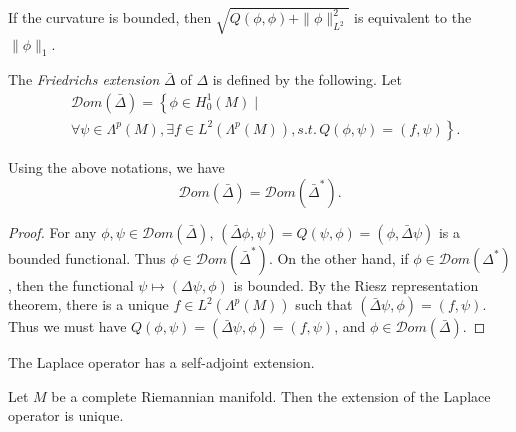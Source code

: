 \begin{proposition}\label{prop1} If the curvature is bounded, then
$\sqrt{Q(\phi,\phi)+\|\phi\|_{L^2}^2}$ is equivalent to the $\|\phi\|_1$.
\end{proposition}


The \emph{Friedrichs extension} $\bar\Delta$ of $\Delta$ is defined by the following. Let
\begin{align*}
&
{\mathcal Dom}(\bar \Delta)=\left\{\phi\in H_0^1(M)\mid\right.\\
&\left.\forall\psi\in \Lambda^p(M), \exists f\in L^2(\Lambda^p(M)), s.t.\, Q(\phi,\psi)=( f,\psi)\right\}.
\end{align*}

\begin{lemma}
Using the above notations, we have
\[
{\mathcal Dom}(\bar\Delta)={\mathcal Dom}(\bar\Delta^*).
\]
\end{lemma}

\begin{proof} For any $\phi,\psi\in{\mathcal Dom}(\bar\Delta)$, $(\bar\Delta\phi,\psi)=Q(\psi,\phi)=(\phi,\bar\Delta\psi)$ is 
a bounded functional. Thus $\phi\in {\mathcal Dom}(\bar\Delta^*)$. On the other hand, if $\phi\in {\mathcal Dom}(\Delta^*)$, then the functional $\psi\mapsto (\Delta\psi,\phi)$ is bounded. By the Riesz representation theorem, there is a unique $f\in L^2(\Lambda^p(M))$ such that $(\bar\Delta\psi,\phi)=(f,\psi)$. Thus we must have $Q(\phi,\psi)=(\bar\Delta\psi,\phi)=(f,\psi)$, and $\phi\in {\mathcal Dom}(\bar\Delta)$.

\end{proof}


\begin{theorem} The Laplace operator has a self-adjoint extension.
\end{theorem}



\begin{theorem}
Let $M$ be a complete Riemannian manifold. Then the extension of the Laplace operator is unique.
\end{theorem}


